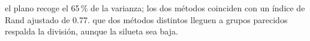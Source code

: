 {el plano recoge el 65\,\% de la varianza; los dos métodos coinciden con un índice de Rand ajustado de 0.77.}
{que dos métodos distintos lleguen a grupos parecidos respalda la división, aunque la silueta sea baja.}
